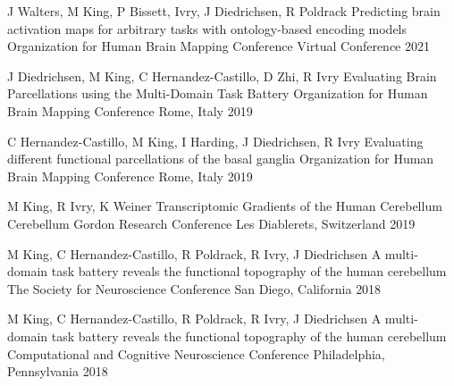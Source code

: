 

\begin{cventries}

  \cventry
    {J Walters, M King, P Bissett,  Ivry, J Diedrichsen, R Poldrack} %
    {Predicting brain activation maps for arbitrary tasks with ontology-based encoding models} %
    {Organization for Human Brain Mapping Conference} %
    {Virtual Conference} %
    {2021} %

  \cventry
    {J Diedrichsen, M King, C Hernandez-Castillo, D Zhi, R Ivry} %
    {Evaluating Brain Parcellations using the Multi-Domain Task Battery} %
    {Organization for Human Brain Mapping Conference} %
    {Rome, Italy} %
    {2019} %
    
  \cventry
    {C Hernandez-Castillo, M King, I Harding, J Diedrichsen, R Ivry} %
    {Evaluating different functional parcellations of the basal ganglia} %
    {Organization for Human Brain Mapping Conference} %
    {Rome, Italy} %
    {2019} %
    
  \cventry
    {M King, R Ivry, K Weiner} %
    {Transcriptomic Gradients of the Human Cerebellum} %
    {Cerebellum Gordon Research Conference} %
    {Les Diablerets, Switzerland} %
    {2019} %
    
  \cventry
    {M King, C Hernandez-Castillo, R Poldrack, R Ivry, J Diedrichsen} %
    {A multi-domain task battery reveals the functional topography of the human cerebellum} %
    {The Society for Neuroscience Conference} %
    {San Diego, California} %
    {2018} %

  \cventry
    {M King, C Hernandez-Castillo, R Poldrack, R Ivry, J Diedrichsen} %
    {A multi-domain task battery reveals the functional topography of the human cerebellum} %
    {Computational and Cognitive Neuroscience Conference} %
    {Philadelphia, Pennsylvania} %
    {2018} %
    

\end{cventries}
